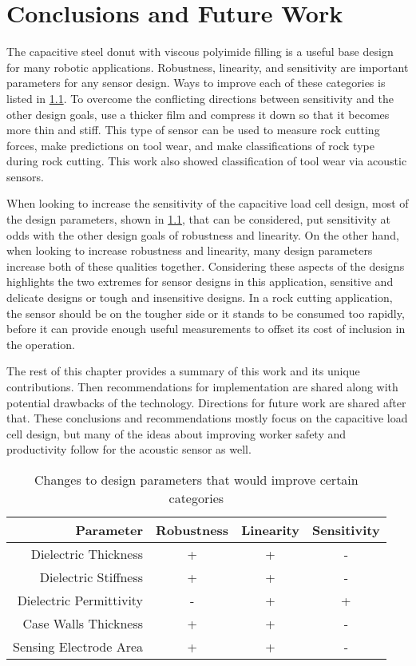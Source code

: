 \chapter{Conclusions and Future Work
\label{chap:11}}

The capacitive steel donut with viscous polyimide filling is a useful base design
for many robotic applications. Robustness, linearity, and sensitivity are important 
parameters for any sensor design. Ways to improve each of these categories is listed in \ref{tab:improve}.
To overcome the conflicting directions between sensitivity and the other design goals,
 use a thicker film and compress it down so that it becomes more thin and stiff.
This type of sensor can be used to measure rock cutting forces, make predictions on tool wear,
and make classifications of rock type during rock cutting.
This work also showed classification of tool wear via acoustic sensors.

When looking to increase the sensitivity of the capacitive load cell design, 
most of the design parameters, shown in \ref{tab:improve},
that can be considered, put sensitivity at odds with the other design goals of robustness and linearity.
On the other hand, when looking to increase robustness and linearity, many design parameters 
increase both of these qualities together. Considering these aspects of the designs highlights
the two extremes for sensor designs in this application, sensitive and delicate designs or tough and insensitive designs.
In a rock cutting application, the sensor should be on the tougher side or it stands to be consumed too rapidly,
before it can provide enough useful measurements to offset its cost of inclusion in the operation.

The rest of this chapter provides a summary of this work and its unique contributions.
Then recommendations for implementation are shared along with potential drawbacks of the technology.
Directions for future work are shared after that.
These conclusions and recommendations mostly focus on the capacitive load cell design,
but many of the ideas about improving worker safety and productivity follow for the acoustic sensor as well.


\begin{table}[]
\centering
\caption{Changes to design parameters that would improve certain categories}
\label{tab:improve}
\begin{tabular}{|r|c|c|c|}
\hline
Parameter               & Robustness   & Linearity    & Sensitivity               \\ \hline
Dielectric Thickness    & +            & +            & -   \\ \hline
Dielectric Stiffness    & +            & +            & -   \\ \hline
Dielectric Permittivity & -            & +            & +   \\ \hline
Case Walls Thickness    & +            & +            & -   \\ \hline
Sensing Electrode Area  & +            & +            & -   \\ \hline
\end{tabular}
\end{table}

